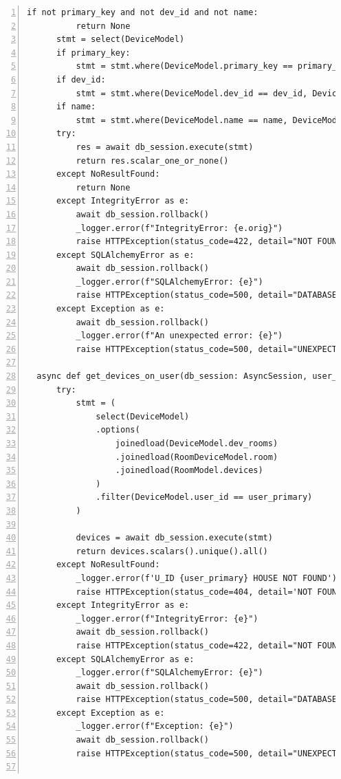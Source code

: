 \documentclass[12pt, letterpaper]{article}
\begin{document}
\begin{lstlisting}[frame=single, style=py, numbers=left, label={lst:dbqueries}, caption={db: queries.py}]
      if not primary_key and not dev_id and not name:
          return None
      stmt = select(DeviceModel)
      if primary_key:
          stmt = stmt.where(DeviceModel.primary_key == primary_key, DeviceModel.user_id == user_id)
      if dev_id:
          stmt = stmt.where(DeviceModel.dev_id == dev_id, DeviceModel.user_id == user_id)
      if name:
          stmt = stmt.where(DeviceModel.name == name, DeviceModel.user_id == user_id)
      try:
          res = await db_session.execute(stmt)
          return res.scalar_one_or_none()
      except NoResultFound:
          return None
      except IntegrityError as e:
          await db_session.rollback()
          _logger.error(f"IntegrityError: {e.orig}")
          raise HTTPException(status_code=422, detail="NOT FOUND")
      except SQLAlchemyError as e:
          await db_session.rollback()
          _logger.error(f"SQLAlchemyError: {e}")
          raise HTTPException(status_code=500, detail="DATABASE ERROR")
      except Exception as e:
          await db_session.rollback()
          _logger.error(f"An unexpected error: {e}")
          raise HTTPException(status_code=500, detail="UNEXPECTED DATABASE ERROR")
      
  async def get_devices_on_user(db_session: AsyncSession, user_primary: int):
      try:
          stmt = (
              select(DeviceModel)
              .options(
                  joinedload(DeviceModel.dev_rooms)
                  .joinedload(RoomDeviceModel.room)
                  .joinedload(RoomModel.devices)
              )
              .filter(DeviceModel.user_id == user_primary)
          )        
          
          devices = await db_session.execute(stmt)
          return devices.scalars().unique().all()
      except NoResultFound:
          _logger.error(f'U_ID {user_primary} HOUSE NOT FOUND')
          raise HTTPException(status_code=404, detail='NOT FOUND')
      except IntegrityError as e:
          _logger.error(f"IntegrityError: {e}")
          await db_session.rollback()
          raise HTTPException(status_code=422, detail="NOT FOUND")
      except SQLAlchemyError as e:
          _logger.error(f"SQLAlchemyError: {e}")
          await db_session.rollback()
          raise HTTPException(status_code=500, detail="DATABASE ERROR")
      except Exception as e:
          _logger.error(f"Exception: {e}")
          await db_session.rollback()
          raise HTTPException(status_code=500, detail="UNEXPECTED DATABASE ERROR")
      

\end{lstlisting}
\end{document}
